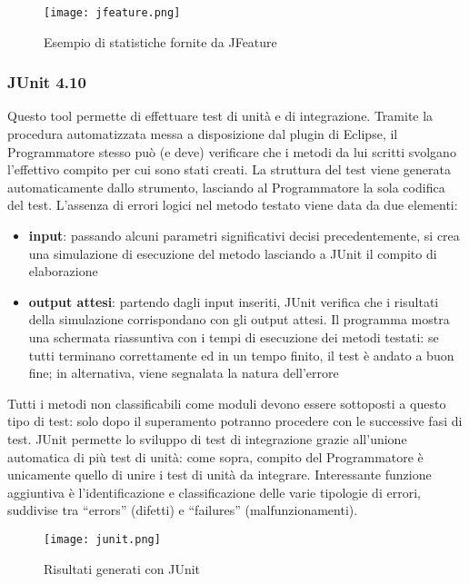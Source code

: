 \documentclass[a4paper,11pt]{article}
\begin{document}
\begin{figure}[h!]
\begin{center}
\texttt{[image: jfeature.png]}
\end{center}
\caption{Esempio di statistiche fornite da JFeature}
\end{figure}

\subsubsection{JUnit 4.10}
Questo tool permette di effettuare test di unit\`a e di integrazione. Tramite la procedura automatizzata messa a disposizione dal plugin di Eclipse, il Programmatore stesso 
pu\`o (e deve) verificare che i metodi da lui scritti svolgano l'effettivo compito per cui sono stati creati. La struttura del test viene generata automaticamente dallo strumento,
lasciando al Programmatore la sola codifica del test.
L'assenza di errori logici nel metodo testato viene data da due elementi:
\begin{itemize}
\item \textbf{input}: passando alcuni parametri significativi decisi precedentemente, si crea una simulazione di esecuzione del metodo lasciando a JUnit il compito di elaborazione 
\item \textbf{output attesi}: partendo dagli input inseriti, JUnit verifica che i risultati della simulazione corrispondano con gli output attesi.
Il programma mostra una schermata riassuntiva con i tempi di esecuzione dei metodi testati: se tutti terminano correttamente ed in un tempo finito, il test \`e andato a buon fine;
in alternativa, viene segnalata la natura dell'errore   
\end{itemize}
Tutti i metodi non classificabili come moduli devono essere sottoposti a questo tipo di test: solo dopo il superamento potranno procedere con le successive fasi di test.
JUnit permette lo sviluppo di test di integrazione grazie all'unione automatica di pi\`u test di unit\`a: come sopra, compito del Programmatore \`e unicamente quello di unire
i test di unit\`a da integrare.
Interessante funzione aggiuntiva \`e l'identificazione e classificazione delle varie tipologie di errori, suddivise tra ``errors'' (difetti) e ``failures'' (malfunzionamenti). 
\newpage
\begin{figure}[h!]
\begin{center}
\texttt{[image: junit.png]}
\end{center}
\caption{Risultati generati con JUnit}
\end{figure}
\end{document}

